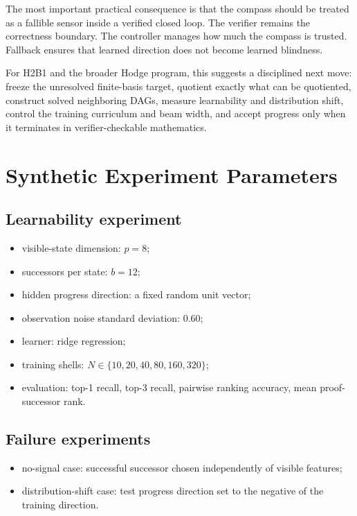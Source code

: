 \documentclass[11pt]{article}
\begin{document}
The most important practical consequence is that the compass should be treated as a fallible sensor inside a verified closed loop. The verifier remains the correctness boundary. The controller manages how much the compass is trusted. Fallback ensures that learned direction does not become learned blindness.

For H2B1 and the broader Hodge program, this suggests a disciplined next move: freeze the unresolved finite-basis target, quotient exactly what can be quotiented, construct solved neighboring DAGs, measure learnability and distribution shift, control the training curriculum and beam width, and accept progress only when it terminates in verifier-checkable mathematics.

\appendix

\section{Synthetic Experiment Parameters}

\subsection{Learnability experiment}
\begin{itemize}
\item visible-state dimension: \(p=8\);
\item successors per state: \(b=12\);
\item hidden progress direction: a fixed random unit vector;
\item observation noise standard deviation: \(0.60\);
\item learner: ridge regression;
\item training shells: \(N\in\{10,20,40,80,160,320\}\);
\item evaluation: top-1 recall, top-3 recall, pairwise ranking accuracy, mean proof-successor rank.
\end{itemize}

\subsection{Failure experiments}
\begin{itemize}
\item no-signal case: successful successor chosen independently of visible features;
\item distribution-shift case: test progress direction set to the negative of the training direction.
\end{itemize}
\end{document}
